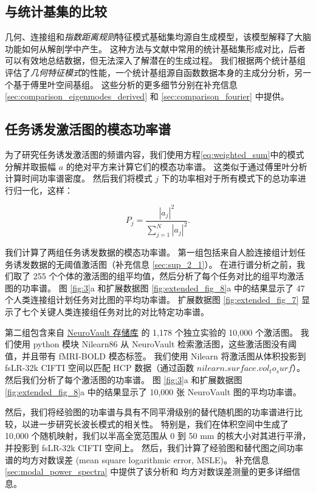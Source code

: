 \documentclass[lang=cn,a4paper,newtx]{elegantpaper}
\begin{document}
\subsection{与统计基集的比较} \label{sec:sets_comparisons}

几何、连接组和\textit{指数距离规则}特征模式基础集均源自生成模型，该模型解释了大脑功能如何从解剖学中产生。
这种方法与文献中常用的统计基础集形成对比，后者可以有效地总结数据，但无法深入了解潜在的生成过程。
我们根据两个统计基组评估了\textit{几何特征模式}的性能，一个统计基组源自函数数据本身的主成分分析，另一个基于傅里叶空间基组。
这些分析的更多细节分别在补充信息\ref{sec:comparison_eigenmodes_derived} 和 \ref{sec:comparison_fourier} 中提供。

\subsection{任务诱发激活图的模态功率谱} \label{sec:modal_power}

为了研究任务诱发激活图的频谱内容，我们使用方程\ref{eq:weighted_sum}中的模式分解并取振幅 $ a $ 的绝对平方来计算它们的模态功率谱。
这类似于通过傅里叶分析计算时间功率谱密度。
然后我们将模式 $ j $ 下的功率相对于所有模式下的总功率进行归一化，这样：

\begin{equation}\label{eq:normalized_power}
	P_j = \frac{|a_j|^2}{\sum_{j=1}^{N} |a_j|^2 }.
\end{equation}

我们计算了两组任务诱发数据的模态功率谱。
第一组包括来自人脸连接组计划任务诱发数据的无阈值激活图（补充信息 \ref{sec:sup_2_1}）。
在进行谱分析之前，我们取了 255 个个体的激活图的组平均值，然后分析了每个任务对比的组平均激活图的功率谱。
图 \ref{fig:3}a 和扩展数据图 \ref{fig:extended_fig_8}a 中的结果显示了 47 个人类连接组计划任务对比图的平均功率谱。 
扩展数据图 \ref{fig:extended_fig_7} 显示了七个关键人类连接组任务对比的对比特定功率谱。


第二组包含来自 \href{https://neuroVault.org/}{NeuroVault 存储库}\cite{gorgolewski2015neurovault} 的 1,178 个独立实验的 10,000 个激活图。
我们使用 python 模块 Nilearn86 从 NeuroVault 检索激活图，这些激活图没有阈值，并且带有 fMRI-BOLD 模态标签。
我们使用 Nilearn 将激活图从体积投影到 fsLR-32k CIFTI 空间以匹配 HCP 数据（通过函数 $ nilearn.surface.vol_to_surf $）。
然后我们分析了每个激活图的功率谱。
图 \ref{fig:3}a 和扩展数据图 \ref{fig:extended_fig_8}a 中的结果显示了 10,000 张 NeuroVault 图的平均功率谱。


然后，我们将经验图的功率谱与具有不同平滑级别的替代随机图的功率谱进行比较，以进一步研究长波长模式的相关性。
特别是，我们在体积空间中生成了 10,000 个随机映射，我们以半高全宽范围从 0 到 50 mm 的核大小对其进行平滑，并投影到 fsLR-32k CIFTI 空间上。
然后，我们计算了经验图和替代图之间功率谱的均方对数误差 (mean square logarithmic error, MSLE)。
补充信息 \ref{sec:modal_power_spectra} 中提供了该分析和 均方对数误差测量的更多详细信息。
\end{document}
